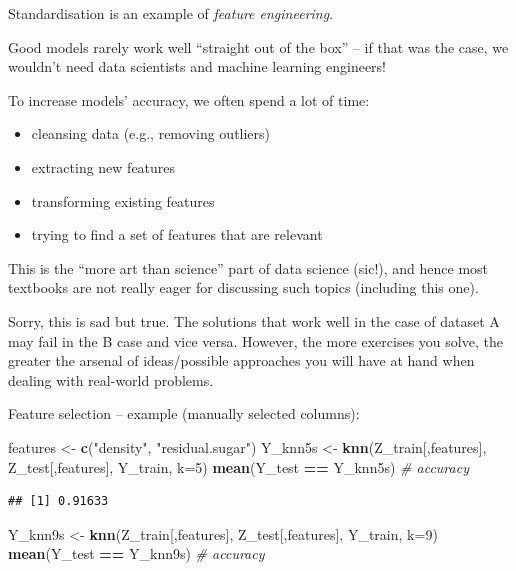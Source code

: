 \documentclass[10pt,b5paper,krantz1]{krantz}
\newenvironment{Shaded}{\begin{snugshade}}{\end{snugshade}}
\newcommand{\CommentTok}[1]{\textcolor[rgb]{0.37,0.37,0.37}{\textit{#1}}}
\newcommand{\DataTypeTok}[1]{\textcolor[rgb]{0.27,0.27,0.27}{#1}}
\newcommand{\DecValTok}[1]{\textcolor[rgb]{0.06,0.06,0.06}{#1}}
\newcommand{\KeywordTok}[1]{\textcolor[rgb]{0.27,0.27,0.27}{\textbf{#1}}}
\newcommand{\NormalTok}[1]{#1}
\newcommand{\OperatorTok}[1]{\textcolor[rgb]{0.43,0.43,0.43}{\textbf{#1}}}
\newcommand{\StringTok}[1]{\textcolor[rgb]{0.5,0.5,0.5}{#1}}
\providecommand{\tightlist}{%
  \setlength{\itemsep}{0pt}\setlength{\parskip}{0pt}}
\begin{document}
Standardisation is an example of \emph{feature engineering}.

Good models rarely work well ``straight out of the box'' -- if that was the case,
we wouldn't need data scientists and machine learning engineers!

To increase models' accuracy, we often spend a lot of time:

\begin{itemize}
\tightlist
\item
  cleansing data (e.g., removing outliers)
\item
  extracting new features
\item
  transforming existing features
\item
  trying to find a set of features that are relevant
\end{itemize}

This is the ``more art than science'' part of data science (sic!), and
hence most textbooks are not really eager for discussing such topics
(including this one).

Sorry, this is sad but true. The solutions that work well in the case of dataset
A may fail in the B case and vice versa. However, the more exercises you solve,
the greater the arsenal of ideas/possible approaches you will have at hand
when dealing with real-world problems.

Feature selection -- example (manually selected columns):

\begin{Shaded}
\begin{Highlighting}[]
\NormalTok{features <-}\StringTok{ }\KeywordTok{c}\NormalTok{(}\StringTok{"density"}\NormalTok{, }\StringTok{"residual.sugar"}\NormalTok{)}
\NormalTok{Y_knn5s <-}\StringTok{ }\KeywordTok{knn}\NormalTok{(Z_train[,features], Z_test[,features],}
\NormalTok{    Y_train, }\DataTypeTok{k=}\DecValTok{5}\NormalTok{)}
\KeywordTok{mean}\NormalTok{(Y_test }\OperatorTok{==}\StringTok{ }\NormalTok{Y_knn5s) }\CommentTok{# accuracy}
\end{Highlighting}
\end{Shaded}

\begin{verbatim}
## [1] 0.91633
\end{verbatim}

\begin{Shaded}
\begin{Highlighting}[]
\NormalTok{Y_knn9s <-}\StringTok{ }\KeywordTok{knn}\NormalTok{(Z_train[,features], Z_test[,features],}
\NormalTok{    Y_train, }\DataTypeTok{k=}\DecValTok{9}\NormalTok{)}
\KeywordTok{mean}\NormalTok{(Y_test }\OperatorTok{==}\StringTok{ }\NormalTok{Y_knn9s) }\CommentTok{# accuracy}
\end{Highlighting}
\end{Shaded}
\end{document}

